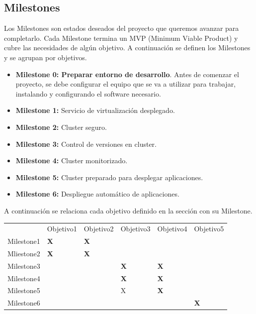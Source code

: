         \subsection{Milestones}
                \begin{text}
                        Los Milestones son estados deseados del proyecto que queremos avanzar para completarlo. Cada Milestone termina un MVP (Minimum Viable Product) y cubre las necesidades de algún objetivo. A continuación se definen los Milestones y se agrupan por objetivos.

                        \begin{itemize}
                                \item \textbf{Milestone 0: Preparar entorno de desarrollo}. Antes de comenzar el proyecto, se debe configurar el equipo que se va a utilizar para trabajar, instalando y configurando el software necesario. 
                                \item \textbf{Milestone 1:} Servicio de virtualización desplegado. 
                                \item \textbf{Milestone 2:} Cluster seguro.
                                \item \textbf{Milestone 3:} Control de versiones en cluster.
                                \item \textbf{Milestone 4:} Cluster monitorizado.
                                \item \textbf{Milestone 5:} Cluster preparado para desplegar aplicaciones.
                                \item \textbf{Milestone 6:} Despliegue automático de aplicaciones.
                        \end{itemize}
                        A continuación se relaciona cada objetivo definido en la sección  con su Milestone.


                \begin{table}[!hbt]
                        \begin{tabular}{llllll}
                                & Objetivo1         & Objetivo2         & Objetivo3         & Objetivo4         & Objetivo5         \\
                                Milestone1 & \textbf{X} & \textbf{X} & \textbf{}  &            &            \\
                                Mliestone2 & \textbf{X} & \textbf{X} &            &            &            \\
                                Milestone3 &            &            & \textbf{X} & \textbf{X} &            \\
                                Milestone4 &            &            & \textbf{X} & \textbf{X} &            \\
                                Milestone5 &            &            & X          & \textbf{X} &            \\
                                Milestone6 &            &            &            &            & \textbf{X}
                        \end{tabular}
                \end{table}


\end{text}
